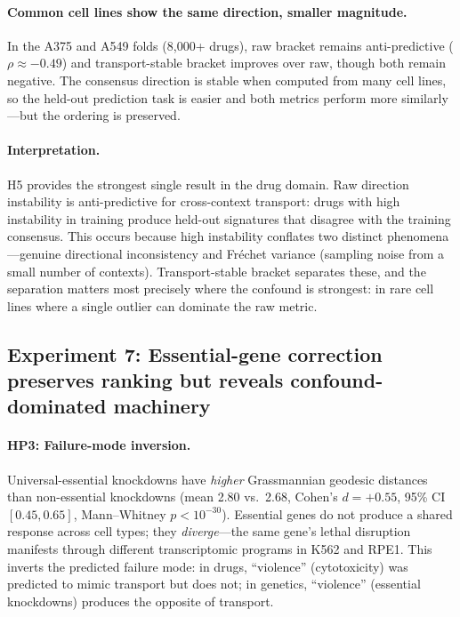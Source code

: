 \documentclass{article}
\begin{document}
\paragraph{Common cell lines show the same direction, smaller magnitude.}
In the A375 and A549 folds (8{,}000+ drugs), raw bracket remains
anti-predictive ($\rho \approx -0.49$) and transport-stable bracket
improves over raw, though both remain negative. The consensus direction
is stable when computed from many cell lines, so the held-out prediction
task is easier and both metrics perform more similarly---but the ordering
is preserved.

\paragraph{Interpretation.}
H5 provides the strongest single result in the drug domain. Raw direction
instability is anti-predictive for cross-context transport: drugs with high
instability in training produce held-out signatures that disagree with the
training consensus. This occurs because high instability conflates two
distinct phenomena---genuine directional inconsistency and Fr\'{e}chet
variance (sampling noise from a small number of contexts). Transport-stable
bracket separates these, and the separation matters most precisely where the
confound is strongest: in rare cell lines where a single outlier can
dominate the raw metric.

\subsection{Experiment 7: Essential-gene correction preserves ranking but reveals confound-dominated machinery}

\paragraph{HP3: Failure-mode inversion.}
Universal-essential knockdowns have \emph{higher} Grassmannian geodesic
distances than non-essential knockdowns (mean 2.80 vs.\ 2.68, Cohen's $d =
+0.55$, 95\% CI $[0.45, 0.65]$, Mann--Whitney $p < 10^{-30}$). Essential
genes do not produce a shared response across cell types; they
\emph{diverge}---the same gene's lethal disruption manifests through
different transcriptomic programs in K562 and RPE1. This inverts the
predicted failure mode: in drugs, ``violence'' (cytotoxicity) was predicted
to mimic transport but does not; in genetics, ``violence'' (essential
knockdowns) produces the opposite of transport.
\end{document}
